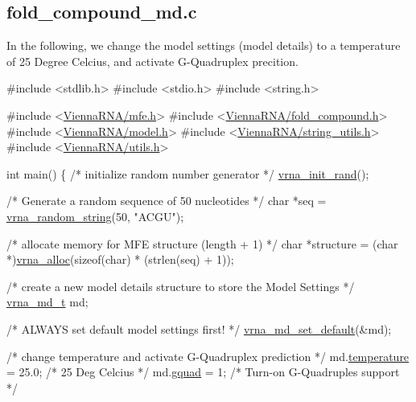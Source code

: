 \subsection*{fold\+\_\+compound\+\_\+md.\+c }

In the following, we change the model settings (model details) to a temperature of 25 Degree Celcius, and activate G-\/\+Quadruplex precition.


\begin{DoxyCodeInclude}
\textcolor{preprocessor}{#include <stdlib.h>}
\textcolor{preprocessor}{#include <stdio.h>}
\textcolor{preprocessor}{#include <string.h>}

\textcolor{preprocessor}{#include <\hyperlink{mfe_8h}{ViennaRNA/mfe.h}>}
\textcolor{preprocessor}{#include <\hyperlink{fold__compound_8h}{ViennaRNA/fold\_compound.h}>}
\textcolor{preprocessor}{#include <\hyperlink{model_8h}{ViennaRNA/model.h}>}
\textcolor{preprocessor}{#include <\hyperlink{string__utils_8h}{ViennaRNA/string\_utils.h}>}
\textcolor{preprocessor}{#include <\hyperlink{utils_8h}{ViennaRNA/utils.h}>}

\textcolor{keywordtype}{int}
main()
\{
  \textcolor{comment}{/* initialize random number generator */}
  \hyperlink{group__utils_ga0ad1f40ea316e5c5918695c35613027a}{vrna\_init\_rand}();

  \textcolor{comment}{/* Generate a random sequence of 50 nucleotides */}
  \textcolor{keywordtype}{char}      *seq = \hyperlink{group__string__utils_ga4eeb3750dcf860b9f3158249f95dbd7f}{vrna\_random\_string}(50, \textcolor{stringliteral}{"ACGU"});

  \textcolor{comment}{/* allocate memory for MFE structure (length + 1) */}
  \textcolor{keywordtype}{char}      *structure = (\textcolor{keywordtype}{char} *)\hyperlink{group__utils_gaf37a0979367c977edfb9da6614eebe99}{vrna\_alloc}(\textcolor{keyword}{sizeof}(\textcolor{keywordtype}{char}) * (strlen(seq) + 1));

  \textcolor{comment}{/* create a new model details structure to store the Model Settings */}
  \hyperlink{group__model__details_structvrna__md__s}{vrna\_md\_t} md;

  \textcolor{comment}{/* ALWAYS set default model settings first! */}
  \hyperlink{group__model__details_ga8ac6ff84936282436f822644bf841f66}{vrna\_md\_set\_default}(&md);

  \textcolor{comment}{/* change temperature and activate G-Quadruplex prediction */}
  md.\hyperlink{group__model__details_a5f7e5c2b65bada5188443470e576aa4b}{temperature}  = 25.0; \textcolor{comment}{/* 25 Deg Celcius */}
  md.\hyperlink{group__model__details_af88a511a2b1f526b4c6213de6cb8fd6e}{gquad}        = 1;    \textcolor{comment}{/* Turn-on G-Quadruples support */}


\end{DoxyCodeInclude}
